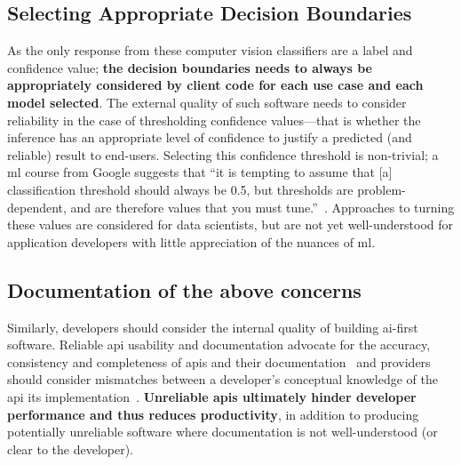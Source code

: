 \subsection{Selecting Appropriate Decision Boundaries}
As the only response from these computer vision classifiers are a label and confidence value; \textbf{the decision boundaries needs to always be appropriately considered by client code for each use case and each model selected}. 
The external quality of such software needs to consider reliability in the case of thresholding confidence values---that is whether the inference has an appropriate level of confidence to justify a predicted (and reliable) result to end-users. Selecting this confidence threshold is non-trivial; a \gls{ml} course from Google suggests that ``it is tempting to assume that [a] classification threshold should always be 0.5, but thresholds are problem-dependent, and are therefore values that you must tune.''~\citep{Classifi7:online}. 
Approaches to turning these values are considered for data scientists, but are not yet well-understood for application developers with little appreciation of the nuances of \gls{ml}. 

\subsection{Documentation of the above concerns}
Similarly, developers should consider the internal quality of building \gls{ai}-first software. Reliable \gls{api} usability and documentation advocate for the accuracy, consistency and completeness of \glspl{api} and their documentation~\citep{Piccioni:2013em,Robillard:2009uk} and providers should consider mismatches between a developer's conceptual knowledge of the \gls{api} its implementation~\citep{Ko:2011fb}. \textbf{Unreliable \glspl{api} ultimately hinder developer performance and thus reduces productivity}, in addition to producing potentially unreliable software where documentation is not well-understood (or clear to the developer).